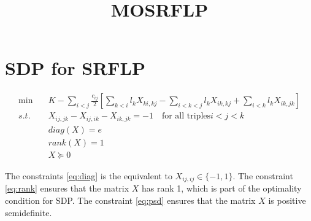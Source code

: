 \documentclass[a4paper]{article}
\begin{document}
\title{MOSRFLP}

\section*{SDP for SRFLP}

\begin{align}
    \min \quad & K - \sum_{i < j} \frac{c_{ij}}{2} \left[\sum_{k<i} l_k X_{ki,kj} - \sum_{i<k<j} l_k X_{ik,kj} + \sum_{i<k} l_k X_{ik,jk}\right]  \label{eq:obj} \\
    s.t. \quad & X_{ij,jk} - X_{ij,ik} - X_{ik,jk} = -1 \quad \text{for all triples} i < j < k                                                   \label{eq:transitivity} \\
               & diag(X) = e                                                                                                                      \label{eq:diag} \\
               & rank(X) = 1                                                                                                                      \label{eq:rank} \\
               & X \succeq 0 \label{eq:psd}
\end{align}

The constraints \eqref{eq:diag} is the equivalent to $X_{ij,ij} \in \{-1,1\}$. The constraint \eqref{eq:rank} ensures that the matrix $X$ has rank 1, which is part of the optimality condition for SDP. The constraint \eqref{eq:psd} ensures that the matrix $X$ is positive semidefinite.
\end{document}
